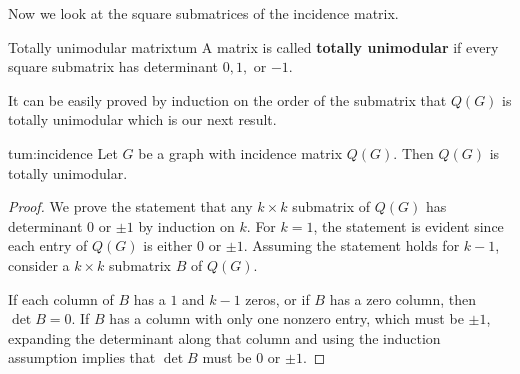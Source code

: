 \documentclass[../basic_graph_theory.tex]{subfiles}
\begin{document}
Now we look at the square submatrices of the incidence matrix.

\begin{Def}{Totally unimodular matrix}{tum}
  A matrix is called \textbf{totally unimodular} if every square submatrix has determinant \(0, 1,\) or \(-1\).
\end{Def}

It can be easily proved by induction on the order of the submatrix that \(Q(G)\) is totally unimodular which is our next result.

\begin{Thm}{}{tum:incidence}
  Let \(G\) be a graph with incidence matrix \(Q(G)\). Then \(Q(G)\) is totally unimodular.
\end{Thm}
\begin{proof}
  We prove the statement that any \(k \times k\) submatrix of \(Q(G)\) has determinant \(0\) or \(\pm 1\) by induction on \(k\). For \(k = 1\), the statement is evident since each entry of \(Q(G)\) is either \(0\) or \(\pm 1\). Assuming the statement holds for \(k - 1\), consider a \(k \times k\) submatrix \(B\) of \(Q(G)\).

  If each column of \(B\) has a \(1\) and \(k - 1\) zeros, or if \(B\) has a zero column, then \( \det B = 0\). If \(B\) has a column with only one nonzero entry, which must be \(\pm 1\), expanding the determinant along that column and using the induction assumption implies that \(\det B\) must be \(0\) or \(\pm 1\).
\end{proof}
\end{document}
